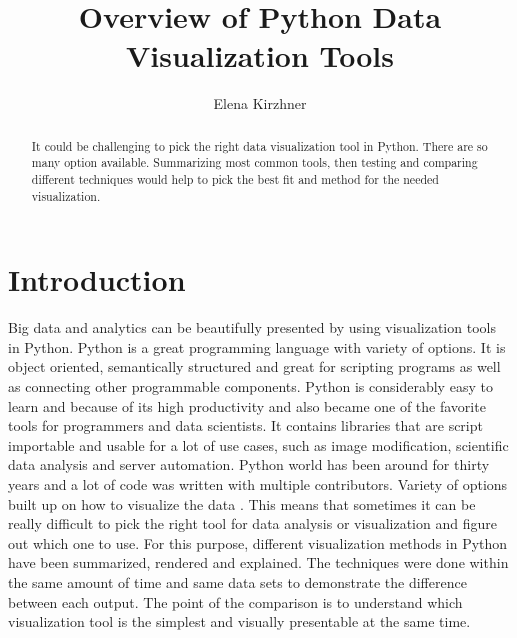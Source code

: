 \documentclass[sigconf]{acmart}
\begin{document}
\title{Overview of Python Data Visualization Tools}


\author{Elena Kirzhner}


\begin{abstract}
It could be challenging to pick the right data visualization tool in Python. There are so many option available. Summarizing most common tools, then testing and comparing different techniques would help to pick the best fit and method for the needed visualization.
\end{abstract}


\maketitle

\section{Introduction}

Big data and analytics can be beautifully presented by using visualization tools in Python. Python is a great programming language with variety of options. It is object oriented, semantically structured and great for scripting programs as well as connecting other programmable components. Python is considerably easy to learn and because of its high productivity and also became one of the favorite tools for programmers and data scientists. It contains libraries that are script importable and usable for a lot of use cases, such as image modification, scientific data analysis and server automation. Python world has been around for thirty years and a lot of code was written with multiple contributors. Variety of options built up on how to visualize the data \cite{van2011python}. This means that sometimes it can be really difficult to pick the right tool for data analysis or visualization and figure out which one to use. For this purpose, different visualization methods in Python have been summarized, rendered and explained. The techniques were done within the same amount of time and same data sets to demonstrate the difference between each output. The point of the comparison is to understand which visualization tool is the simplest and visually presentable at the same time. 
\end{document}
